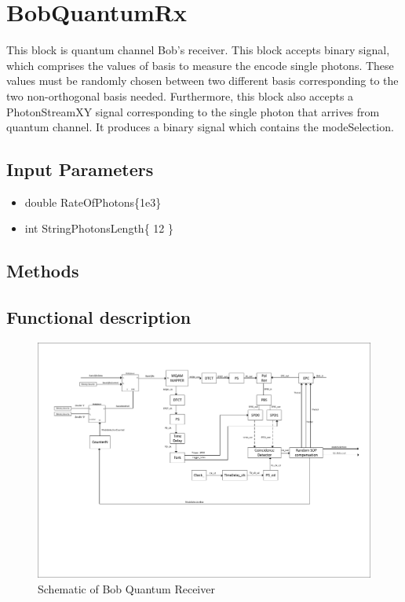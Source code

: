 \clearpage

\section{BobQuantumRx}

\maketitle
This block is quantum channel Bob's receiver. This block accepts binary signal, which comprises the values of basis to measure the encode single photons. These values must be randomly chosen between two different basis corresponding to the two non-orthogonal basis needed. Furthermore, this block also accepts a PhotonStreamXY signal corresponding to the single photon that arrives from quantum channel. It produces a binary signal which contains the modeSelection.


\subsection*{Input Parameters}

	\begin{itemize}
		\item double RateOfPhotons\{1e3\}
	
		\item int StringPhotonsLength\{ 12 \}
	\end{itemize}

\subsection*{Methods}


\subsection*{Functional description}

\begin{figure}[h]
	\centering
	\includegraphics[clip, trim=0.5cm 6.0cm 0.5cm 2cm, width=1.0\textwidth]{./lib/BobQuantumRx/figures/BobQRx_diagram.pdf}
	\caption{Schematic of Bob Quantum Receiver}\label{bobQuantumRxDiagram}
\end{figure}

